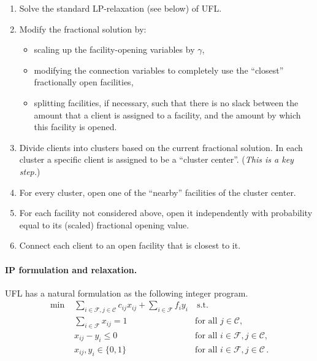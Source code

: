\documentclass[11pt]{article}
\begin{document}
\begin{enumerate}
\item
    Solve the standard LP-relaxation (see below) of UFL. 
\item \label{point:mod}
    Modify the fractional solution by: \begin{itemize}
 \item scaling up the facility-opening variables by $\gamma$,
 \item modifying the connection variables to completely use the ``closest''
	fractionally open facilities,
 \item splitting facilities, if necessary, such that there is no slack
       between the amount that a client is assigned to a facility, and the
       amount by which this facility is opened.
\end{itemize}
\item \label{point:cluster}  
    Divide clients into clusters based on the current fractional solution.
    In each cluster a specific client is assigned to be a ``cluster center''.
    (\emph{This is a key step.})
    
\item \label{point:open1}
    For every cluster, open one of the ``nearby'' facilities of the cluster center.
\item
    For each facility not considered above,
    open it independently with probability equal to its (scaled) 
fractional opening value. 
\item
    Connect each client to an open facility that is closest to it.
\end{enumerate}


\paragraph{IP formulation and relaxation.}

UFL has a natural formulation as the following integer program.
\begin{eqnarray}
\nonumber
\mbox{min  }&\sum_{i \in \mathcal{F}, j \in \mathcal{C}}{c_{ij}x_{ij}} +
\sum_{i \in \mathcal{F}}{f_i y_i} & ~\mbox{s.t.} \\ \nonumber
&\sum_{i \in \mathcal{F}} x_{ij} = 1 & \mbox{for all }j \in \mathcal{C}, \\ \nonumber
&x_{ij} - y_i \leq 0 & \mbox{for all } i \in \mathcal{F}, j \in \mathcal{C},\\ \label{eq_int}
&x_{ij},y_i \in \{ 0,1 \}       & \mbox{for all } i \in \mathcal{F}, j \in \mathcal{C}\,.
\end{eqnarray}
\end{document}
